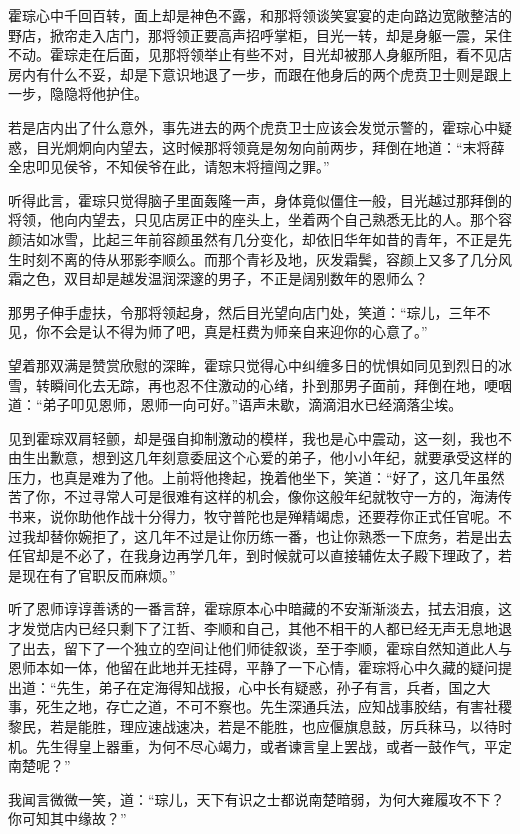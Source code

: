 霍琮心中千回百转，面上却是神色不露，和那将领谈笑宴宴的走向路边宽敞整洁的野店，掀帘走入店门，那将领正要高声招呼掌柜，目光一转，却是身躯一震，呆住不动。霍琮走在后面，见那将领举止有些不对，目光却被那人身躯所阻，看不见店房内有什么不妥，却是下意识地退了一步，而跟在他身后的两个虎贲卫士则是跟上一步，隐隐将他护住。

若是店内出了什么意外，事先进去的两个虎贲卫士应该会发觉示警的，霍琮心中疑惑，目光炯炯向内望去，这时候那将领竟是匆匆向前两步，拜倒在地道：“末将薛全忠叩见侯爷，不知侯爷在此，请恕末将擅闯之罪。”

听得此言，霍琮只觉得脑子里面轰隆一声，身体竟似僵住一般，目光越过那拜倒的将领，他向内望去，只见店房正中的座头上，坐着两个自己熟悉无比的人。那个容颜洁如冰雪，比起三年前容颜虽然有几分变化，却依旧华年如昔的青年，不正是先生时刻不离的侍从邪影李顺么。而那个青衫及地，灰发霜鬓，容颜上又多了几分风霜之色，双目却是越发温润深邃的男子，不正是阔别数年的恩师么？

那男子伸手虚扶，令那将领起身，然后目光望向店门处，笑道：“琮儿，三年不见，你不会是认不得为师了吧，真是枉费为师亲自来迎你的心意了。”

望着那双满是赞赏欣慰的深眸，霍琮只觉得心中纠缠多日的忧惧如同见到烈日的冰雪，转瞬间化去无踪，再也忍不住激动的心绪，扑到那男子面前，拜倒在地，哽咽道：“弟子叩见恩师，恩师一向可好。”语声未歇，滴滴泪水已经滴落尘埃。

见到霍琮双肩轻颤，却是强自抑制激动的模样，我也是心中震动，这一刻，我也不由生出歉意，想到这几年刻意委屈这个心爱的弟子，他小小年纪，就要承受这样的压力，也真是难为了他。上前将他搀起，挽着他坐下，笑道：“好了，这几年虽然苦了你，不过寻常人可是很难有这样的机会，像你这般年纪就牧守一方的，海涛传书来，说你助他作战十分得力，牧守普陀也是殚精竭虑，还要荐你正式任官呢。不过我却替你婉拒了，这几年不过是让你历练一番，也让你熟悉一下庶务，若是出去任官却是不必了，在我身边再学几年，到时候就可以直接辅佐太子殿下理政了，若是现在有了官职反而麻烦。”

听了恩师谆谆善诱的一番言辞，霍琮原本心中暗藏的不安渐渐淡去，拭去泪痕，这才发觉店内已经只剩下了江哲、李顺和自己，其他不相干的人都已经无声无息地退了出去，留下了一个独立的空间让他们师徒叙谈，至于李顺，霍琮自然知道此人与恩师本如一体，他留在此地并无挂碍，平静了一下心情，霍琮将心中久藏的疑问提出道：“先生，弟子在定海得知战报，心中长有疑惑，孙子有言，兵者，国之大事，死生之地，存亡之道，不可不察也。先生深通兵法，应知战事胶结，有害社稷黎民，若是能胜，理应速战速决，若是不能胜，也应偃旗息鼓，厉兵秣马，以待时机。先生得皇上器重，为何不尽心竭力，或者谏言皇上罢战，或者一鼓作气，平定南楚呢？”

我闻言微微一笑，道：“琮儿，天下有识之士都说南楚暗弱，为何大雍履攻不下？你可知其中缘故？”

